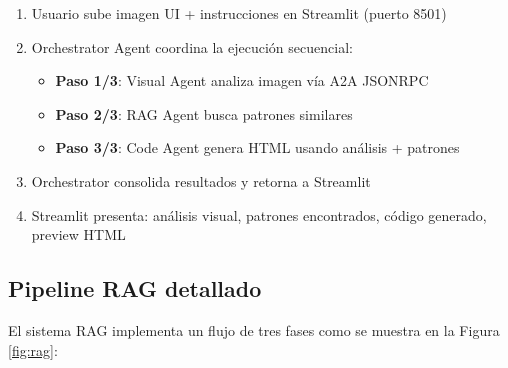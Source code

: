 \documentclass[12pt,a4paper]{article}
\begin{document}
\begin{enumerate}
    \item Usuario sube imagen UI + instrucciones en Streamlit (puerto 8501)
    \item Orchestrator Agent coordina la ejecución secuencial:
    \begin{itemize}
        \item \textbf{Paso 1/3}: Visual Agent analiza imagen vía A2A JSONRPC
        \item \textbf{Paso 2/3}: RAG Agent busca patrones similares
        \item \textbf{Paso 3/3}: Code Agent genera HTML usando análisis + patrones
    \end{itemize}
    \item Orchestrator consolida resultados y retorna a Streamlit
    \item Streamlit presenta: análisis visual, patrones encontrados, código generado, preview HTML
\end{enumerate}

\subsection{Pipeline RAG detallado}

El sistema RAG implementa un flujo de tres fases como se muestra en la Figura \ref{fig:rag}:
\end{document}
